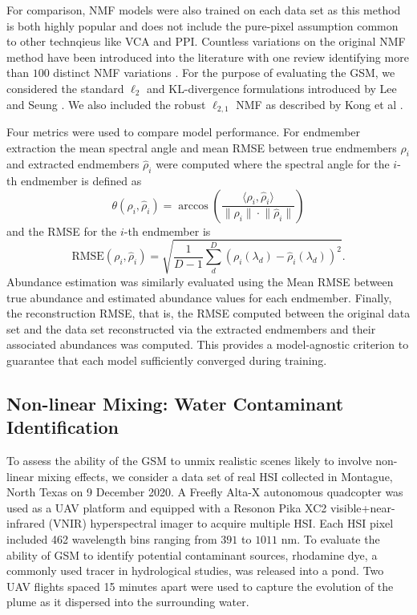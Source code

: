 \documentclass[remotesensing,article,submit,pdftex,moreauthors]{Definitions/mdpi}
\begin{document}
For comparison, NMF models were also trained on each data set as this method is both highly popular and does not include the pure-pixel assumption common to other technqieus like VCA and PPI. Countless variations on the original NMF method have been introduced into the literature with one review identifying more than $100$ distinct NMF variations \cite{unmixing-nmf-review}. For the purpose of evaluating the GSM, we considered the standard $\ell_2$ and KL-divergence formulations introduced by Lee and Seung \cite{nmf-algorithms}. We also included the robust $\ell_{2,1}$ NMF as described by Kong et al \cite{nmf-l21}.

Four metrics were used to compare model performance. For endmember extraction the mean spectral angle and mean RMSE between true endmembers $\rho_i$ and extracted endmembers $\hat{\rho}_i$ were computed where the spectral angle for the $i$-th endmember is defined as 
\begin{equation}
    \theta(\rho_i, \hat{\rho}_i) =  \arccos\left( \dfrac{\langle \rho_i, \hat{\rho}_i \rangle}{\lVert \rho_i \rVert \cdot \lVert \hat{\rho}_i \rVert}\right)
\end{equation}
and the RMSE for the $i$-th endmember is
\begin{equation}
    \text{RMSE}(\rho_i, \hat{\rho}_i) = \sqrt{\frac{1}{D-1}\sum_d^D\left(\rho_i(\lambda_d) - \hat{\rho}_i(\lambda_d) \right)^2}.
\end{equation}
Abundance estimation was similarly evaluated using the Mean RMSE between true abundance and estimated abundance values for each endmember. Finally, the reconstruction RMSE, that is, the RMSE computed between the original data set and the data set reconstructed via the extracted endmembers and their associated abundances was computed. This provides a model-agnostic criterion to guarantee that each model sufficiently converged during training.

\subsection{Non-linear Mixing: Water Contaminant Identification}

To assess the ability of the GSM to unmix realistic scenes likely to involve non-linear mixing effects, we consider a data set of real HSI collected in Montague, North Texas on 9 December 2020. A Freefly Alta-X autonomous quadcopter was used as a UAV platform and equipped with a Resonon Pika XC2 visible+near-infrared (VNIR) hyperspectral imager to acquire multiple HSI. Each HSI pixel included 462 wavelength bins ranging from $391$ to $1011$ nm. To evaluate the ability of GSM to identify potential contaminant sources, rhodamine dye, a commonly used tracer in hydrological studies, was released into a pond. Two UAV flights spaced 15 minutes apart were used to capture the evolution of the plume as it dispersed into the surrounding water.
\end{document}
